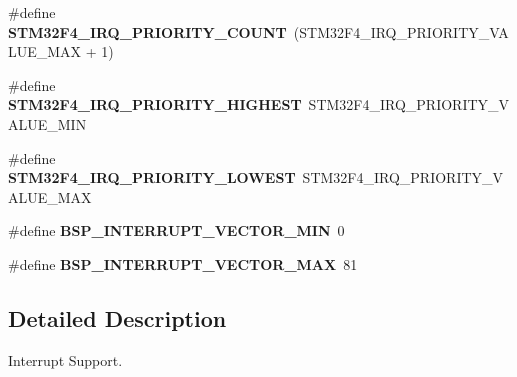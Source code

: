\begin{DoxyCompactItemize}
\item 
\mbox{\label{group__stm32f4__interrupt_ga60621b136a739ac7c65a2c3aee964b87}} 
\#define {\bfseries S\+T\+M32\+F4\+\_\+\+I\+R\+Q\+\_\+\+P\+R\+I\+O\+R\+I\+T\+Y\+\_\+\+C\+O\+U\+NT}~(S\+T\+M32\+F4\+\_\+\+I\+R\+Q\+\_\+\+P\+R\+I\+O\+R\+I\+T\+Y\+\_\+\+V\+A\+L\+U\+E\+\_\+\+M\+AX + 1)
\item 
\mbox{\label{group__stm32f4__interrupt_gab0296d7fd6fac76e9d31ffaa377f6ff8}} 
\#define {\bfseries S\+T\+M32\+F4\+\_\+\+I\+R\+Q\+\_\+\+P\+R\+I\+O\+R\+I\+T\+Y\+\_\+\+H\+I\+G\+H\+E\+ST}~S\+T\+M32\+F4\+\_\+\+I\+R\+Q\+\_\+\+P\+R\+I\+O\+R\+I\+T\+Y\+\_\+\+V\+A\+L\+U\+E\+\_\+\+M\+IN
\item 
\mbox{\label{group__stm32f4__interrupt_ga40b5ca55495740b47e0ea00f94cad0f4}} 
\#define {\bfseries S\+T\+M32\+F4\+\_\+\+I\+R\+Q\+\_\+\+P\+R\+I\+O\+R\+I\+T\+Y\+\_\+\+L\+O\+W\+E\+ST}~S\+T\+M32\+F4\+\_\+\+I\+R\+Q\+\_\+\+P\+R\+I\+O\+R\+I\+T\+Y\+\_\+\+V\+A\+L\+U\+E\+\_\+\+M\+AX
\item 
\mbox{\label{group__stm32f4__interrupt_ga64cbb02dfea4d6923abccaa0087d2a0d}} 
\#define {\bfseries B\+S\+P\+\_\+\+I\+N\+T\+E\+R\+R\+U\+P\+T\+\_\+\+V\+E\+C\+T\+O\+R\+\_\+\+M\+IN}~0
\item 
\mbox{\label{group__stm32f4__interrupt_gae4a2cdda5816a4c83c2fac0a49880c6e}} 
\#define {\bfseries B\+S\+P\+\_\+\+I\+N\+T\+E\+R\+R\+U\+P\+T\+\_\+\+V\+E\+C\+T\+O\+R\+\_\+\+M\+AX}~81
\end{DoxyCompactItemize}


\subsection{Detailed Description}
Interrupt Support. 

